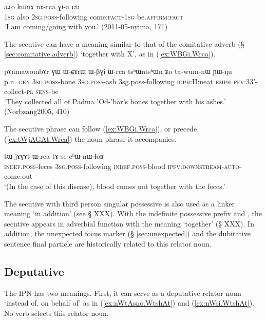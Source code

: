 \begin{exe}
\ex \label{ex:nArca.Gia}
 \gll  aʑo kɯnɤ nɤ-rca ɣi-a ɕti \\
 \textsc{1sg} also \textsc{2sg}.\textsc{poss}-following come:\textsc{fact}-\textsc{1sg} be.\textsc{affirm}:\textsc{fact} \\
\glt `I am coming/going with you.' (2011-05-nyima, 171)
\end{exe}

The secutive can have a meaning similar to that of the comitative adverb (§ \ref{sec:comitative.adverb}) `together with X', as in (\ref{ex:WBGi.Wrca}).

\begin{exe}
\ex \label{ex:WBGi.Wrca}
 \gll  pɤnmawombɤr ɣɯ ɯ-ɕɤrɯ ɯ-βɣi ɯ-rca tsʰɯntsʰɯn ʑo ta-wum-nɯ ɲɯ-ŋu \\ 
p.n. \textsc{gen} \textsc{3sg}.\textsc{poss}-bone \textsc{3sg}.\textsc{poss}-ash 3sg.poss-following \textsc{idph}:II:neat \textsc{emph} \textsc{pfv}:3\fl{}3'-collect-\textsc{pl} \textsc{sens}-be  \\
\glt `They collected all of Padma 'Od-'bar's bones together with his ashes.' (Norbzang2005, 410)
\end{exe}

The secutive phrase can follow  (\ref{ex:WBGi.Wrca}), or precede (\ref{ex:tWjAGAt.Wrca}) the noun phrase it accompanies.

\begin{exe}
\ex \label{ex:tWjAGAt.Wrca}
 \gll   tɯ-jɤɣɤt ɯ-rca tɤ-se cʰɯ-nɯ-ɬoʁ \\
 \textsc{indef}.\textsc{poss}-feces \textsc{3sg}.\textsc{poss}-following \textsc{indef}.\textsc{poss}-blood \textsc{ipfv}:\textsc{downstream}-\textsc{auto}-come.out \\
 \glt `(In the case of this disease), blood comes out together with the feces.' 
 \end{exe}

The secutive with third person singular possessive  is also used as a linker meaning `in addition' (see § XXX). With the indefinite possessive prefix  and  , the secutive appears in adverbial function with the meaning `together' (§ XXX). In addition, the unexpected focus marker  (§ \ref{sec:unexpected}) and the dubitative sentence final particle  are historically related to this relator noun.

\subsection{Deputative} \label{sec:deputative} 
The IPN  has two meanings. First, it can serve as a deputative relator noun `instead of, on behalf of' as in (\ref{ex:nWtAsno.WtshAt}) and (\ref{ex:nWsi.WtshAt}). No verb selects this relator noun. 

